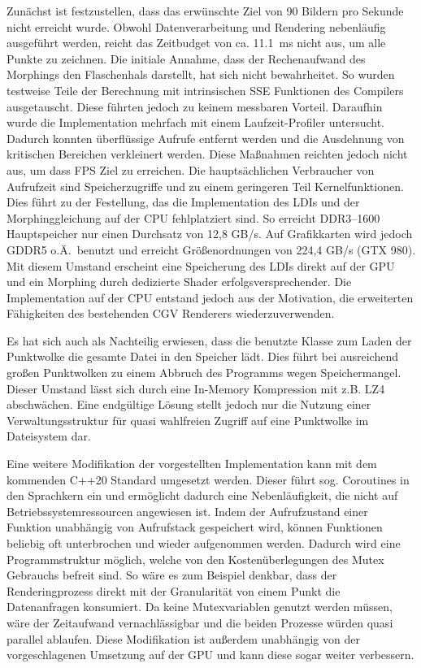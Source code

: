 \documentclass[hyperref, beleg, german]{cgvpub}
\begin{document}
Zunächst ist festzustellen, dass das erwünschte Ziel von 90 Bildern pro Sekunde
nicht erreicht wurde. Obwohl Datenverarbeitung und Rendering nebenläufig
ausgeführt werden, reicht das Zeitbudget von ca. \SI{11,1}{\milli\second} nicht
aus, um alle Punkte zu zeichnen. Die initiale Annahme, dass der Rechenaufwand
des Morphings den Flaschenhals darstellt, hat sich nicht bewahrheitet. So
wurden testweise Teile der Berechnung mit intrinsischen SSE Funktionen des
Compilers ausgetauscht. Diese führten jedoch zu keinem messbaren Vorteil.
Daraufhin wurde die Implementation mehrfach mit einem Laufzeit-Profiler
untersucht. Dadurch konnten überflüssige Aufrufe entfernt werden und die
Ausdehnung von kritischen Bereichen verkleinert werden. Diese Maßnahmen
reichten jedoch nicht aus, um dass FPS Ziel zu erreichen. Die hauptsächlichen
Verbraucher von Aufrufzeit sind Speicherzugriffe und zu einem geringeren Teil
Kernelfunktionen. Dies führt zu der Festellung, das die Implementation des LDIs
und der Morphinggleichung auf der CPU fehlplatziert sind. So erreicht
DDR3--1600 Hauptspeicher nur einen Durchsatz von 12,8 GB/s. Auf Grafikkarten
wird jedoch GDDR5 o.Ä.\ benutzt und erreicht Größenordnungen von 224,4 GB/s
(GTX 980). Mit diesem Umstand erscheint eine Speicherung des LDIs direkt auf
der GPU und ein Morphing durch dedizierte Shader erfolgsversprechender. Die
Implementation auf der CPU entstand jedoch aus der Motivation, die erweiterten
Fähigkeiten des bestehenden CGV Renderers wiederzuverwenden.

Es hat sich auch als Nachteilig erwiesen, dass die benutzte Klasse zum Laden
der Punktwolke die gesamte Datei in den Speicher lädt. Dies führt bei
ausreichend großen Punktwolken zu einem Abbruch des Programms wegen
Speichermangel. Dieser Umstand lässt sich durch eine In-Memory Kompression mit
z.B. LZ4 abschwächen. Eine endgültige Lösung stellt jedoch nur die Nutzung
einer Verwaltungsstruktur für quasi wahlfreien Zugriff auf eine Punktwolke im
Dateisystem dar.

Eine weitere Modifikation der vorgestellten Implementation kann mit dem
kommenden C++20 Standard umgesetzt werden. Dieser führt sog. Coroutines in den
Sprachkern ein und ermöglicht dadurch eine Nebenläufigkeit, die nicht auf
Betriebssystemressourcen angewiesen ist. Indem der Aufrufzustand einer Funktion
unabhängig von Aufrufstack gespeichert wird, können Funktionen beliebig oft
unterbrochen und wieder aufgenommen werden. Dadurch wird eine Programmstruktur
möglich, welche von den Kostenüberlegungen des Mutex Gebrauchs befreit sind. So
wäre es zum Beispiel denkbar, dass der Renderingprozess direkt mit der
Granularität von einem Punkt die Datenanfragen konsumiert. Da keine
Mutexvariablen genutzt werden müssen, wäre der Zeitaufwand vernachlässigbar und
die beiden Prozesse würden quasi parallel ablaufen. Diese Modifikation ist
außerdem unabhängig von der vorgeschlagenen Umsetzung auf der GPU und kann
diese sogar weiter verbessern.
\end{document}
